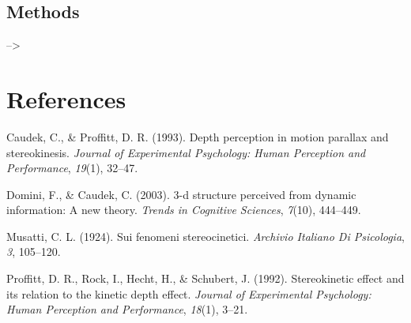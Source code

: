 \documentclass[
  man]{apa6}
\newlength{\cslhangindent}
\newenvironment{CSLReferences}[2] %
 {\begin{list}{}{%
  \setlength{\itemindent}{0pt}
  \setlength{\leftmargin}{0pt}
  \setlength{\parsep}{0pt}
  \ifodd #1
   \setlength{\leftmargin}{\cslhangindent}
   \setlength{\itemindent}{-1\cslhangindent}
  \fi
  \setlength{\itemsep}{#2\baselineskip}}}
 {\end{list}}
\begin{document}
\subsection{Methods}\label{methods}

--\textgreater{}

\newpage

\section{References}\label{references}

\label{refs}
\begin{CSLReferences}{1}{0}
Caudek, C., \& Proffitt, D. R. (1993). Depth perception in motion parallax and stereokinesis. \emph{Journal of Experimental Psychology: Human Perception and Performance}, \emph{19}(1), 32--47.

Domini, F., \& Caudek, C. (2003). 3-d structure perceived from dynamic information: A new theory. \emph{Trends in Cognitive Sciences}, \emph{7}(10), 444--449.

Musatti, C. L. (1924). Sui fenomeni stereocinetici. \emph{Archivio Italiano Di Psicologia}, \emph{3}, 105--120.

Proffitt, D. R., Rock, I., Hecht, H., \& Schubert, J. (1992). Stereokinetic effect and its relation to the kinetic depth effect. \emph{Journal of Experimental Psychology: Human Perception and Performance}, \emph{18}(1), 3--21.

\end{CSLReferences}
\end{document}
